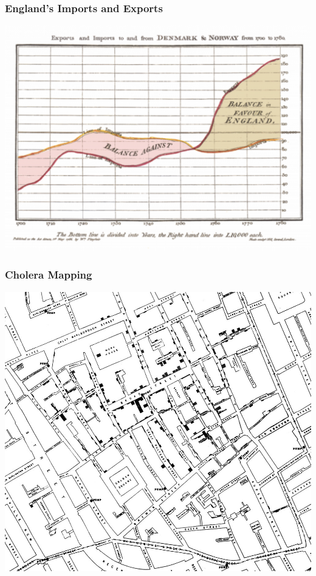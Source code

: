 \documentclass{beamer} %
\begin{document}
\begin{frame}\frametitle{England's Imports and Exports}
		\centering
	\includegraphics[width=\linewidth]{england.png}
\end{frame}


\begin{frame}\frametitle{Cholera Mapping}
		\centering
	\includegraphics[width=0.8\linewidth]{cholera.jpg}
\end{frame}
\end{document}
